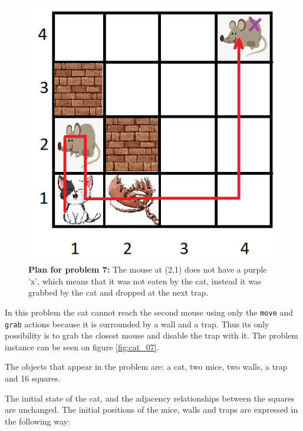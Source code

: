 \begin{minipage}{\textwidth}
\begin{multicols}{2}
\begin{figure}[H]
    \centering
    \includegraphics[width=\linewidth]{fig/A3/cat_07_sol.png}
    \caption{\textbf{Plan for problem 7:} The mouse at (2,1) does not have a purple 'x', which means that it was not eaten by the cat, instead it was grabbed by the cat and dropped at the next trap.}
    \label{fig:cat_07_sol}
\end{figure}

\end{multicols}
\medskip
\end{minipage}

In this problem the cat cannot reach the second mouse using only the \verb|move| and \verb|grab| actions because it is surrounded by a wall and a trap. Thus its only possibility is to grab the closest mouse and disable the trap with it. The problem instance can be seen on figure \ref{fig:cat_07}. 

The objects that appear in the problem are: a cat, two mice, two walls, a trap and 16 squares.



The initial state of the cat, and the adjacency relationships between the squares are unchanged. The initial positions of the mice, walls and traps are expressed in the following way:

